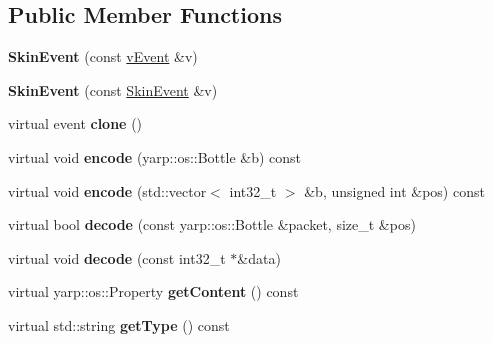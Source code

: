 \subsection*{Public Member Functions}
\begin{DoxyCompactItemize}
\item 
\mbox{\label{classev_1_1SkinEvent_a8921fcb24d5b22cbb4640cc78d37eb6b}} 
{\bfseries Skin\+Event} (const \hyperlink{classev_1_1vEvent}{v\+Event} \&v)
\item 
\mbox{\label{classev_1_1SkinEvent_a8e8554c5d291013c572eb93723f95138}} 
{\bfseries Skin\+Event} (const \hyperlink{classev_1_1SkinEvent}{Skin\+Event} \&v)
\item 
\mbox{\label{classev_1_1SkinEvent_a3571bc8aba54704e0f2835ab0f0a71b0}} 
virtual event {\bfseries clone} ()
\item 
\mbox{\label{classev_1_1SkinEvent_a5996a03de9a5711704365084ca13c410}} 
virtual void {\bfseries encode} (yarp\+::os\+::\+Bottle \&b) const
\item 
\mbox{\label{classev_1_1SkinEvent_aaaafe7c85dc5439da54a9924ee6e669e}} 
virtual void {\bfseries encode} (std\+::vector$<$ int32\+\_\+t $>$ \&b, unsigned int \&pos) const
\item 
\mbox{\label{classev_1_1SkinEvent_a8708aa78b532d8518bd194095930c915}} 
virtual bool {\bfseries decode} (const yarp\+::os\+::\+Bottle \&packet, size\+\_\+t \&pos)
\item 
\mbox{\label{classev_1_1SkinEvent_a52c6901440f63cb00914c343ab7a4eb2}} 
virtual void {\bfseries decode} (const int32\+\_\+t $\ast$\&data)
\item 
\mbox{\label{classev_1_1SkinEvent_a0441e22892786d232040ab275da33ae4}} 
virtual yarp\+::os\+::\+Property {\bfseries get\+Content} () const
\item 
\mbox{\label{classev_1_1SkinEvent_ab38d415129fd823bb99190c1711c4038}} 
virtual std\+::string {\bfseries get\+Type} () const
\end{DoxyCompactItemize}
